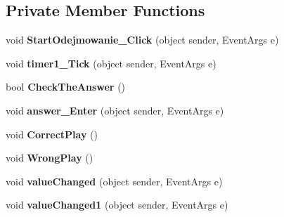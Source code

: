 \subsection*{Private Member Functions}
\begin{DoxyCompactItemize}
\item 
\mbox{\label{class_quiz___matematyczny_1_1_odejmowanie_aa563253dc7884acf415b566e726d8879}} 
void {\bfseries Start\+Odejmowanie\+\_\+\+Click} (object sender, Event\+Args e)
\item 
\mbox{\label{class_quiz___matematyczny_1_1_odejmowanie_a4ade5b220ead56659648532bbff3beb9}} 
void {\bfseries timer1\+\_\+\+Tick} (object sender, Event\+Args e)
\item 
\mbox{\label{class_quiz___matematyczny_1_1_odejmowanie_a6eb9bd7210d9d4efe9cfb6211b48906f}} 
bool {\bfseries Check\+The\+Answer} ()
\item 
\mbox{\label{class_quiz___matematyczny_1_1_odejmowanie_abd6c9350a1904876193ddaa945210222}} 
void {\bfseries answer\+\_\+\+Enter} (object sender, Event\+Args e)
\item 
\mbox{\label{class_quiz___matematyczny_1_1_odejmowanie_a5e126109e1470e5cdae0f3645902bb0d}} 
void {\bfseries Correct\+Play} ()
\item 
\mbox{\label{class_quiz___matematyczny_1_1_odejmowanie_ab53ef9205ed6c089c415a014b070986a}} 
void {\bfseries Wrong\+Play} ()
\item 
\mbox{\label{class_quiz___matematyczny_1_1_odejmowanie_afb53b8c2340ac3fd52b53177f533dcc4}} 
void {\bfseries value\+Changed} (object sender, Event\+Args e)
\item 
\mbox{\label{class_quiz___matematyczny_1_1_odejmowanie_a706d427a2f77f644385112c860227df1}} 
void {\bfseries value\+Changed1} (object sender, Event\+Args e)
\item 
\mbox{\label{class_quiz___matematyczny_1_1_odejmowanie_a87cc2f34e5e65ab74ace45e2ad009091}} 

\end{DoxyCompactItemize}
